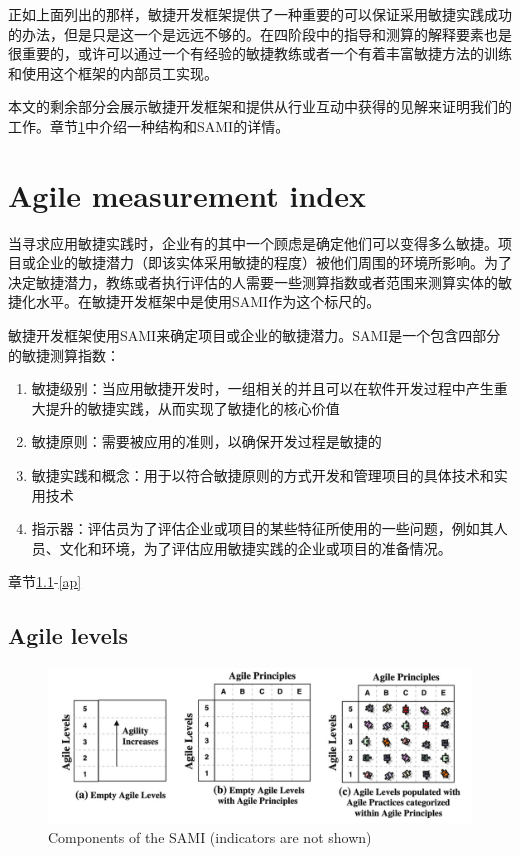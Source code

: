\documentclass[twocolumn]{svjour3}[]
\begin{document}
正如上面列出的那样，敏捷开发框架提供了一种重要的可以保证采用敏捷实践成功的办法，但是只是这一个是远远不够的。在四阶段中的指导和测算的解释要素也是很重要的，或许可以通过一个有经验的敏捷教练或者一个有着丰富敏捷方法的训练和使用这个框架的内部员工实现。

本文的剩余部分会展示敏捷开发框架和提供从行业互动中获得的见解来证明我们的工作。章节\ref{ami}中介绍一种结构和SAMI的详情。

\section{Agile measurement index}
\label{ami}

当寻求应用敏捷实践时，企业有的其中一个顾虑是确定他们可以变得多么敏捷\cite{sidky2007disciplined}。项目或企业的敏捷潜力（即该实体采用敏捷的程度）被他们周围的环境所影响。为了决定敏捷潜力，教练或者执行评估的人需要一些测算指数或者范围来测算实体的敏捷化水平。在敏捷开发框架中是使用SAMI作为这个标尺的。

敏捷开发框架使用SAMI来确定项目或企业的敏捷潜力。SAMI是一个包含四部分的敏捷测算指数：

\begin{enumerate}
    \item 敏捷级别：当应用敏捷开发时，一组相关的并且可以在软件开发过程中产生重大提升的敏捷实践，从而实现了敏捷化的核心价值
    \item 敏捷原则：需要被应用的准则，以确保开发过程是敏捷的
    \item 敏捷实践和概念：用于以符合敏捷原则的方式开发和管理项目的具体技术和实用技术
    \item 指示器：评估员为了评估企业或项目的某些特征所使用的一些问题，例如其人员、文化和环境，为了评估应用敏捷实践的企业或项目的准备情况。
\end{enumerate}

章节\ref{al}-\ref{ap}

\subsection{Agile levels}
\label{al}

\begin{figure} [htb]
    \centering
    \includegraphics[width=1.0\textwidth]{img/sami-components.jpg}
    \caption{Components of the SAMI (indicators are not shown)}
    \label{sami-com}
\end{figure}
\end{document}
